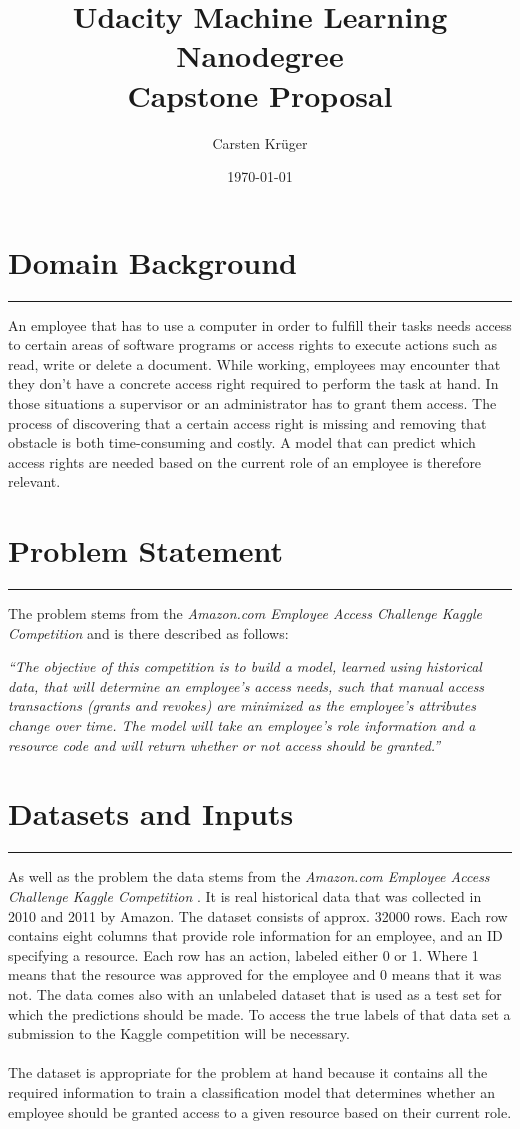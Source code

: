 \documentclass[11pt]{article}
\title{Udacity Machine Learning Nanodegree \\ Capstone Proposal}
\author{Carsten Kr\"uger}
\date{\today}
\def\sectionheader#1{\section*{#1}\vskip -0.3cm\hrule\vskip 0.3cm}
\begin{document}
\maketitle

\sectionheader{Domain Background}

An employee that has to use a computer in order to fulfill their tasks needs access 
to certain areas of software programs or access rights to execute actions such as read, 
write or delete a document. While working, employees may encounter that they don't have a 
concrete access right required to perform the task at hand. In those situations a supervisor or an 
administrator has to grant them access. The process of discovering that a certain access 
right is missing and removing that obstacle is both time-consuming and costly.
A model that can predict which access rights are needed based on the current role of an 
employee is therefore relevant.

\sectionheader{Problem Statement}

The problem stems from the {\it Amazon.com Employee Access Challenge Kaggle Competition} 
\cite{kaggleAmazon} and is there described as follows:

{\it ``The objective of this competition is to build a model, learned using historical data, that
 will determine an employee's access needs, such that manual access transactions 
 (grants and revokes) are minimized as the employee's attributes change over time. 
 The model will take an employee's role information and a resource code and will return whether 
 or not access should be granted.''}

\sectionheader{Datasets and Inputs}

As well as the problem the data stems from the {\it Amazon.com Employee Access Challenge 
Kaggle Competition} \cite{kaggleAmazon}. It is real historical data that was collected in 
2010 and 2011 by Amazon. The dataset consists of approx. 32000 rows. Each row contains
eight columns that provide role information for an employee, and an ID specifying a resource. 
Each row has an action, labeled either 0 or 1. Where 1 means that the resource was 
approved for the employee and 0 means that it was not. The data comes also with an unlabeled
dataset that is used as a test set for which the predictions should be made. To access the
true labels of that data set a submission to the Kaggle competition will be necessary.
\\ \\
The dataset is appropriate for the problem at hand because it contains all the required 
information to train a classification model that determines whether an employee should be 
granted access to a given resource based on their current role.
\end{document}
